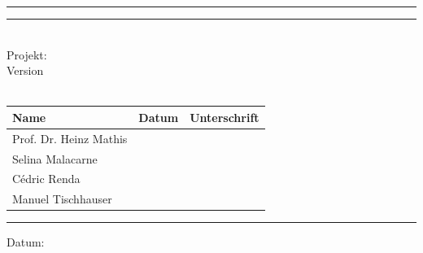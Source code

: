 
\hrule
{}
\hrule
\begin{center}
   	\begin{flushright}
   		\Huge
   		\titleinfo\\
   		\Large
   		Projekt: \subjectinfo\\
   		\large
   		Version\versioninfo\\
   		\authorinfo \\			
   	\end{flushright}
   	\renewcommand\arraystretch{1.5}
   	\begin{tabularx}{\linewidth}{|X|X|X|}
   		\hline
   		\textbf{Name} & \textbf{Datum} & \textbf{Unterschrift}\\
   		\hline
   		Prof. Dr. Heinz Mathis & & \\
   		\hline
   		Selina Malacarne& & \\
   		\hline
   		Cédric Renda& & \\
   		\hline
   		Manuel Tischhauser& & \\
        \hline
   	\end{tabularx}
\end{center}
\cfoot{}
\hrule
{
    \footnotesize 
    \begin{flushright}
        Datum: \dateinfo
    \end{flushright}
}

\restoregeometry